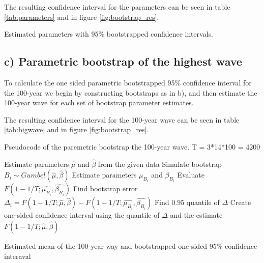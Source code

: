 \documentclass[a4paper]{article}
\begin{document}
The resulting confidence interval for the parameters can be seen in table \ref{tab:parameters} and in figure \ref{fig:bootstrap_res}.

\begin{table}[H]
    \centering
    \caption{Estimated parameters with 95\% bootstrapped confidence intervals.}
    \label{tab:parameters}
    
\end{table}

\subsection*{c) Parametric bootstrap of the highest wave}

To calculate the one sided parametric bootstrapped 95\% confidence interval for the 100-year we begin by constructing bootstraps as in b), and then estimate the 100-year wave for each set of bootstrap parameter estimates.

The resulting confidence interval for the 100-year wave can be seen in table \ref{tab:bigwave} and in figure \ref{fig:bootstrap_res}.

\begin{algorithm}
    \caption{Pseudocode of the paremetric bootstrap the 100-year wave. T = 3*14*100 = 4200}
    \begin{algorithmic}
        \State Estimate parameters $\hat{\mu}$ and $\hat{\beta}$ from the given data
        \State Simulate bootstrap $B_i \sim Gumbel(\hat{\mu}, \hat{\beta})$
        \State Estimate parameters $\mu_{B_i}$ and $\beta_{B_i}$
        \State Evaluate $F(1-1/T; \hat{\mu_{B_i}}, \hat{\beta_{B_i}})$
        \State Find bootstrap error $\Delta_i = F(1-1/T; \hat{\mu}, \hat{\beta}) - F(1-1/T; \hat{\mu_{B_i}}, \hat{\beta_{B_i}})$
        \EndFor
        \State Find $0.95$ quantile of $\Delta$
        \State Create one-sided confidence interval using the quantile of $\Delta$ and the estimate $F(1-1/T; \hat{\mu}, \hat{\beta})$
    \end{algorithmic}
\end{algorithm}

\begin{table}[H]
    \centering
    \caption{Estimated mean of the 100-year way and bootstrapped one sided 95\% confidence interaval}
    \label{tab:bigwave}
    
\end{table}
\end{document}
